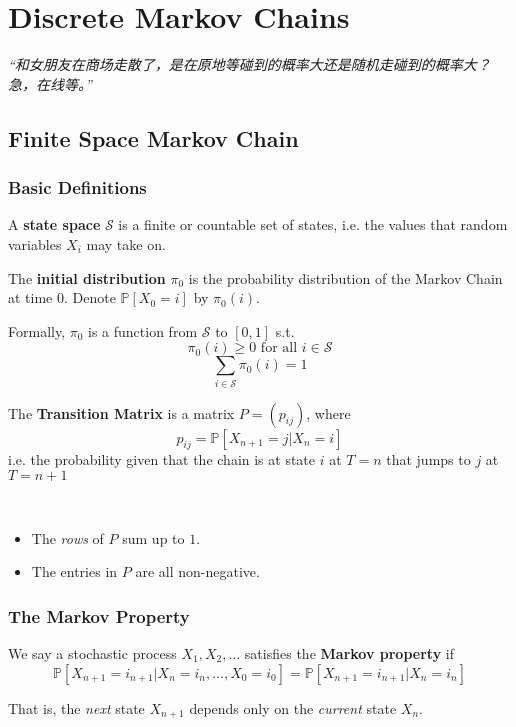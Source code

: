 \chapter{Discrete Markov Chains}
\emph{“和女朋友在商场走散了，是在原地等碰到的概率大还是随机走碰到的概率大？急，在线等。”}
\newpage

\section{Finite Space Markov Chain}

\subsection{Basic Definitions}
\begin{definition}
    A \textbf{state space} $\mathcal{S}$ is a finite or countable set of states, i.e. the values that random variables $X_i$ may take on.
\end{definition}

\begin{definition}
    The \textbf{initial distribution} $\pi_0$ is the probability distribution of the Markov Chain at time $0$. Denote $\mathbb{P}[X_0 = i]$ by $\pi_0(i)$.
\end{definition}
\begin{remark}
    Formally, $\pi_0$ is a function from $\mathcal{S}$ to $[0,1]$ s.t.
    \[ \pi_0(i) \ge 0 \text{ for all $i\in\mathcal{S}$} \]
    \[ \sum_{i\in\mathcal{S}} \pi_0(i) = 1\]
\end{remark}

\begin{definition}
    The \textbf{Transition Matrix} is a matrix $P = (p_{ij})$, where
    \[ p_{ij} = \mathbb{P}[X_{n+1} = j | X_n = i] \]
    i.e. the probability given that the chain is at state $i$ at $T=n$ that jumps to $j$ at $T=n+1$
\end{definition}
\begin{remark}
    ~{}
    \begin{itemize}
        \item The \emph{rows} of $P$ sum up to $1$.
        \item The entries in $P$ are all non-negative.
    \end{itemize}
\end{remark}

\subsection{The Markov Property}
\begin{definition}
    We say a stochastic process $X_1, X_2, \dots $ satisfies the \textbf{Markov property} if 
    \[ \mathbb{P}[X_{n+1} = i_{n+1} | X_n = i_n, \dots, X_0 = i_0] = \mathbb{P}[X_{n+1} = i_{n+1} | X_n = i_n] \]
\end{definition}
That is, the \emph{next} state $X_{n+1}$ depends only on the \emph{current} state $X_n$.

